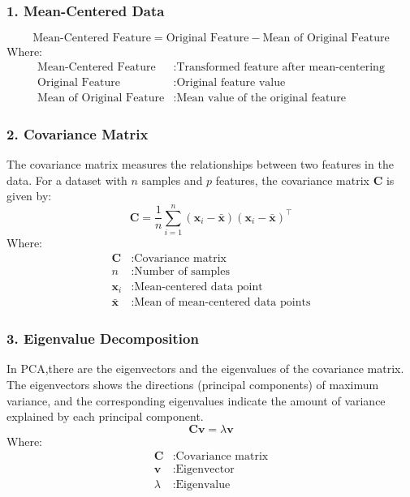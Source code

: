 \documentclass[12pt, a4paper,oneside]{book}
\numberwithin{equation}{section}
\begin{document}
\subsubsection*{1. Mean-Centered Data}

\begin{equation}
\text{Mean-Centered Feature} = \text{Original Feature} - \text{Mean of Original Feature}
\end{equation}
Where:
\begin{align*}
\text{Mean-Centered Feature} &: \text{Transformed feature after mean-centering} \\
\text{Original Feature} &: \text{Original feature value} \\
\text{Mean of Original Feature} &: \text{Mean value of the original feature}
\end{align*}

\subsubsection*{2. Covariance Matrix}
The covariance matrix measures the relationships between two  features in the data. For a dataset with \(n\) samples and \(p\) features, the covariance matrix \(\mathbf{C}\) is given by:
\begin{equation}
\mathbf{C} = \frac{1}{n} \sum_{i=1}^{n} (\mathbf{x}_i - \bar{\mathbf{x}}) (\mathbf{x}_i - \bar{\mathbf{x}})^\top
\end{equation}
Where:
\begin{align*}
\mathbf{C} &: \text{Covariance matrix} \\
n &: \text{Number of samples} \\
\mathbf{x}_i &: \text{Mean-centered data point} \\
\bar{\mathbf{x}} &: \text{Mean of mean-centered data points}
\end{align*}

\subsubsection*{3. Eigenvalue Decomposition}
In PCA,there are the eigenvectors and  the eigenvalues of the covariance matrix. The eigenvectors shows the directions (principal components) of maximum variance, and the corresponding eigenvalues indicate the amount of variance explained by each principal component.
\begin{equation}
\mathbf{C} \mathbf{v} = \lambda \mathbf{v}
\end{equation}
Where:
\begin{align*}
\mathbf{C} &: \text{Covariance matrix} \\
\mathbf{v} &: \text{Eigenvector} \\
\lambda &: \text{Eigenvalue}
\end{align*}
\end{document}
